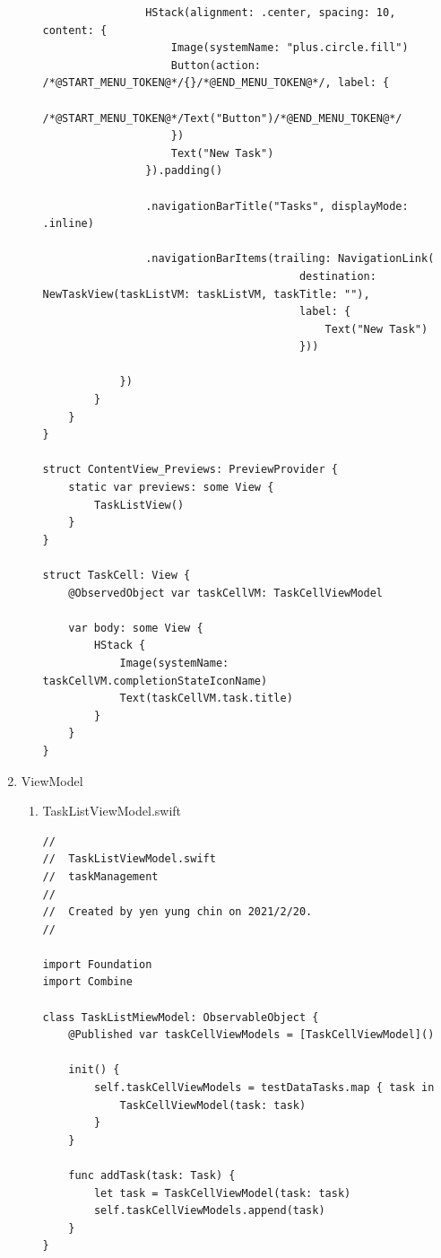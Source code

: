 \documentclass[a4paper,12pt]{article}
\begin{document}
\begin{enumerate}
\begin{enumerate}
\begin{lstlisting}
                HStack(alignment: .center, spacing: 10, content: {
                    Image(systemName: "plus.circle.fill")
                    Button(action: /*@START_MENU_TOKEN@*/{}/*@END_MENU_TOKEN@*/, label: {
                        /*@START_MENU_TOKEN@*/Text("Button")/*@END_MENU_TOKEN@*/
                    })
                    Text("New Task")
                }).padding()

                .navigationBarTitle("Tasks", displayMode: .inline)

                .navigationBarItems(trailing: NavigationLink(
                                        destination: NewTaskView(taskListVM: taskListVM, taskTitle: ""),
                                        label: {
                                            Text("New Task")
                                        }))

            })
        }
    }
}

struct ContentView_Previews: PreviewProvider {
    static var previews: some View {
        TaskListView()
    }
}

struct TaskCell: View {
    @ObservedObject var taskCellVM: TaskCellViewModel

    var body: some View {
        HStack {
            Image(systemName: taskCellVM.completionStateIconName)
            Text(taskCellVM.task.title)
        }
    }
}

\end{lstlisting}
\end{enumerate}
\item ViewModel
\label{sec:org25c5da1}
\begin{enumerate}
\item TaskListViewModel.swift
\label{sec:org6dac5da}
\lstset{breaklines=true,language=swift,label= ,caption= ,captionpos=b,firstnumber=1,numbers=left}
\begin{lstlisting}
//
//  TaskListViewModel.swift
//  taskManagement
//
//  Created by yen yung chin on 2021/2/20.
//

import Foundation
import Combine

class TaskListMiewModel: ObservableObject {
    @Published var taskCellViewModels = [TaskCellViewModel]()

    init() {
        self.taskCellViewModels = testDataTasks.map { task in
            TaskCellViewModel(task: task)
        }
    }

    func addTask(task: Task) {
        let task = TaskCellViewModel(task: task)
        self.taskCellViewModels.append(task)
    }
}

\end{lstlisting}
\end{enumerate}
\end{enumerate}
\end{document}
